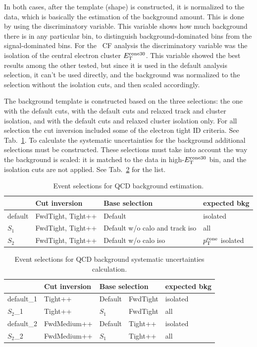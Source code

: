 In both cases, after the template (shape) is constructed, it is normalized to the data, which is basically the estimation of the background amount. This is done by using the discriminatory variable. This variable shows how much background there is in any particular bin, to distinguish background-dominated bins from the signal-dominated bins. For the \Zee\ CF analysis the discriminatory variable was the isolation of the central electron cluster $E_{\mathrm{T}}^{\mathrm{cone30}}$. This variable showed the best results among the other tested, but since it is used in the default analysis selection, it can't be used directly, and the background was normalized to the selection without the isolation cuts, and then scaled accordingly.

The background template is constructed based on the three selections: the one with the default cuts, with the default cuts and relaxed track and cluster isolation, and with the default cuts and relaxed cluster isolation only. For all selection the cut inversion included some of the electron tight ID criteria. See Tab.~\ref{tab:bkg_qcd_samples}. To calculate the systematic uncertainties for the background additional selections must be constructed. These selections must take into account the way the background is scaled: it is matched to the data in high-$E_{\mathrm{T}}^{\mathrm{cone30}}$ bin, and the isolation cuts are not applied. See Tab.~\ref{tab:bkg_qcd_unc_samples} for the list.

\begin{table}
\centering
\begin{tabular}{ llll } \hline \hline
    & Cut inversion  &   Base selection    & expected bkg  \\ \hline
default & FwdTight, Tight++ & Default  & isolated \\
$S_1$   & FwdTight, Tight++ & Default w/o calo and track iso & all \\
$S_2$   & FwdTight, Tight++ & Default w/o calo iso       & $p_{\mathrm{T}}^{\mathrm{cone}}$ isolated\\
\hline \hline
\end{tabular}
\caption{Event selections for QCD background estimation.}
\label{tab:bkg_qcd_samples}
\end{table}
\begin{table}
\centering
\begin{tabular}{ lll@{ w/o }ll } \hline \hline
    & Cut inversion  &  \multicolumn{2}{l}{Base selection}    & expected bkg \\ \hline
default\_1 & Tight++     & Default & FwdTight  & isolated \\
$S_2$\_1     & Tight++     & $S_1$ & FwdTight      & all \\
default\_2 & FwdMedium++ & Default & Tight++   & isolated \\
$S_2$\_2     & FwdMedium++ & $S_1$ & Tight++       & all \\
\hline \hline
\end{tabular}
\caption{Event selections for QCD background systematic uncertainties calculation.}
\label{tab:bkg_qcd_unc_samples}
\end{table}

